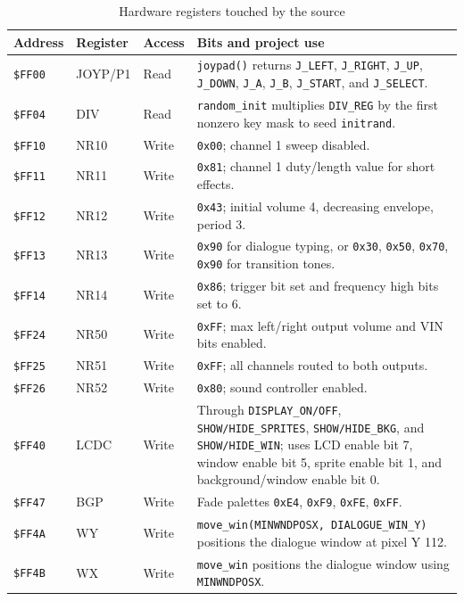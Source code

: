 \begin{table}[h]
\centering
\small
\begin{tabular}{p{1.8cm}p{1.9cm}p{1.3cm}p{8.3cm}}
\toprule
\textbf{Address} & \textbf{Register} & \textbf{Access} & \textbf{Bits and project use} \\
\midrule
\texttt{\$FF00} & JOYP/P1 & Read & \texttt{joypad()} returns \texttt{J\_LEFT}, \texttt{J\_RIGHT}, \texttt{J\_UP}, \texttt{J\_DOWN}, \texttt{J\_A}, \texttt{J\_B}, \texttt{J\_START}, and \texttt{J\_SELECT}. \\
\texttt{\$FF04} & DIV & Read & \texttt{random\_init} multiplies \texttt{DIV\_REG} by the first nonzero key mask to seed \texttt{initrand}. \\
\texttt{\$FF10} & NR10 & Write & \texttt{0x00}; channel 1 sweep disabled. \\
\texttt{\$FF11} & NR11 & Write & \texttt{0x81}; channel 1 duty/length value for short effects. \\
\texttt{\$FF12} & NR12 & Write & \texttt{0x43}; initial volume 4, decreasing envelope, period 3. \\
\texttt{\$FF13} & NR13 & Write & \texttt{0x90} for dialogue typing, or \texttt{0x30}, \texttt{0x50}, \texttt{0x70}, \texttt{0x90} for transition tones. \\
\texttt{\$FF14} & NR14 & Write & \texttt{0x86}; trigger bit set and frequency high bits set to 6. \\
\texttt{\$FF24} & NR50 & Write & \texttt{0xFF}; max left/right output volume and VIN bits enabled. \\
\texttt{\$FF25} & NR51 & Write & \texttt{0xFF}; all channels routed to both outputs. \\
\texttt{\$FF26} & NR52 & Write & \texttt{0x80}; sound controller enabled. \\
\texttt{\$FF40} & LCDC & Write & Through \texttt{DISPLAY\_ON/OFF}, \texttt{SHOW/HIDE\_SPRITES}, \texttt{SHOW/HIDE\_BKG}, and \texttt{SHOW/HIDE\_WIN}; uses LCD enable bit 7, window enable bit 5, sprite enable bit 1, and background/window enable bit 0. \\
\texttt{\$FF47} & BGP & Write & Fade palettes \texttt{0xE4}, \texttt{0xF9}, \texttt{0xFE}, \texttt{0xFF}. \\
\texttt{\$FF4A} & WY & Write & \texttt{move\_win(MINWNDPOSX, DIALOGUE\_WIN\_Y)} positions the dialogue window at pixel Y 112. \\
\texttt{\$FF4B} & WX & Write & \texttt{move\_win} positions the dialogue window using \texttt{MINWNDPOSX}. \\
\bottomrule
\end{tabular}
\caption{Hardware registers touched by the source}
\end{table}

